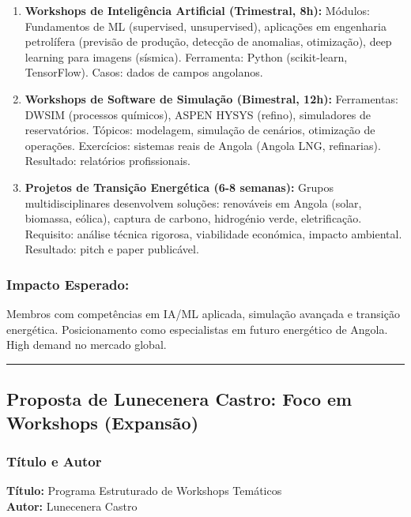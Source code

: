 \documentclass[12pt,a4paper]{article}
\begin{document}
\begin{enumerate}[itemsep=0.25cm]
    \item \textbf{Workshops de Inteligência Artificial (Trimestral, 8h):} Módulos: Fundamentos de ML (supervised, unsupervised), aplicações em engenharia petrolífera (previsão de produção, detecção de anomalias, otimização), deep learning para imagens (sísmica). Ferramenta: Python (scikit-learn, TensorFlow). Casos: dados de campos angolanos.
    
    \item \textbf{Workshops de Software de Simulação (Bimestral, 12h):} Ferramentas: DWSIM (processos químicos), ASPEN HYSYS (refino), simuladores de reservatórios. Tópicos: modelagem, simulação de cenários, otimização de operações. Exercícios: sistemas reais de Angola (Angola LNG, refinarias). Resultado: relatórios profissionais.
    
    \item \textbf{Projetos de Transição Energética (6-8 semanas):} Grupos multidisciplinares desenvolvem soluções: renováveis em Angola (solar, biomassa, eólica), captura de carbono, hidrogénio verde, eletrificação. Requisito: análise técnica rigorosa, viabilidade económica, impacto ambiental. Resultado: pitch e paper publicável.
\end{enumerate}

\subsubsection*{Impacto Esperado:}
Membros com competências em IA/ML aplicada, simulação avançada e transição energética. Posicionamento como especialistas em futuro energético de Angola. High demand no mercado global.

\textcolor{spe-secondary}{\hspace{0.5cm}\rule{0.4\linewidth}{0.8pt}}

\subsection{Proposta de Lunecenera Castro: Foco em Workshops (Expansão)}

\subsubsection*{Título e Autor}
\textbf{Título:} Programa Estruturado de Workshops Temáticos \\
\textbf{Autor:} Lunecenera Castro
\end{document}
